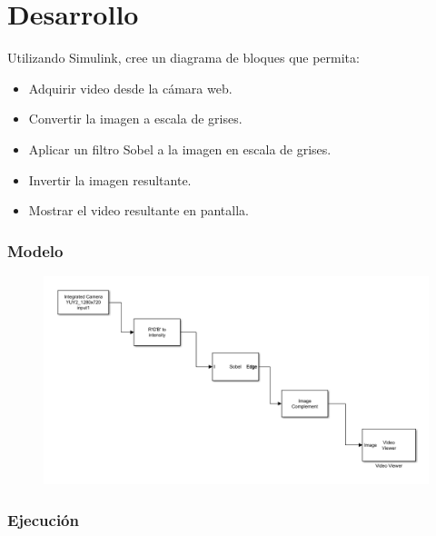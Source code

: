 \documentclass{article}
\begin{document}
	\section{Desarrollo}
	
	Utilizando Simulink, cree un diagrama de bloques que permita:
	
	\begin{itemize}
		\item Adquirir video desde la cámara web.
		\item Convertir la imagen a escala de grises.
		\item Aplicar un filtro Sobel a la imagen en escala de grises.
		\item Invertir la imagen resultante.
		\item Mostrar el video resultante en pantalla.
	\end{itemize}
	
	\newpage
	
	\subsubsection{Modelo}
	
	\begin{figure}[h]
		\centering
		\includegraphics[width=15cm]{img.png}
	\end{figure}
	
	\subsubsection{Ejecución}
	
\end{document}
